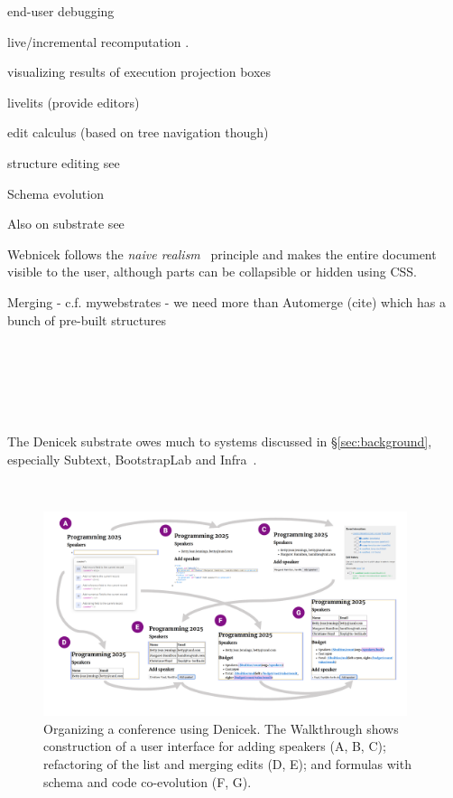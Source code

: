 \documentclass[sigconf,anonymous,screen]{acmart}
\begin{document}
end-user debugging
\cite{kissinger-2006-debugging}

live/incremental recomputation
\cite{mcdirmid-2013-usable,horowitz-2023-engraft,petricek-2020-live}.

visualizing results of execution
projection boxes \cite{lerner-2020-boxes}

livelits (provide editors)
\cite{omar-2021-livelits}

edit calculus (based on tree navigation though)
\cite{omar-2017-hazelnut}

structure editing see \cite{beckman-2023-sandblocks}

Schema evolution

Also on substrate see



Webnicek follows the \emph{naive realism}~\cite{disessa-1986-boxer} principle and makes the entire
document visible to the user, although parts can be collapsible or hidden using CSS.


Merging - c.f. mywebstrates - we need more than Automerge (cite)
which has a bunch of pre-built structures

~

~

\cite{gobert-2023-lorgnette}

~

The Denicek substrate owes much to systems discussed in \S\ref{sec:background},
especially Subtext, BootstrapLab and Infra~\cite{edwards-2005-subtext,jakubovic-2022-ladder,hall-2017-infra}.


~


\begin{figure}[t]
\vspace{-0.5em}
\includegraphics[width=0.95\textwidth,clip,trim=1cm 1cm 1cm 0.5cm]{fig/walkthrough.pdf}
\vspace{-1em}
\caption{Organizing a conference using Denicek. The Walkthrough shows construction of a user
  interface for adding speakers (A, B, C); refactoring of the list and merging edits (D, E); and
  formulas with schema and code co-evolution (F, G).}
\label{fig:walkthrough}
\end{figure}
\end{document}
